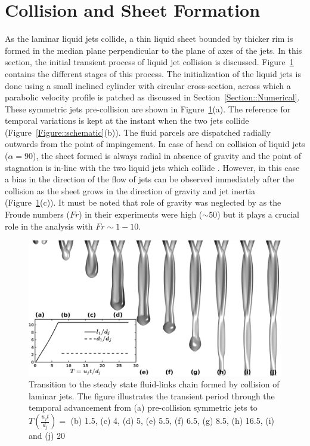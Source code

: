 \documentclass[%
aip,
sd,%
amsmath,amssymb,
preprint,%
author-year,%
]{revtex4-1}
\begin{document}
\section{Collision and Sheet Formation}
As the laminar liquid jets collide, a thin liquid sheet bounded by thicker rim is formed in the median plane perpendicular to the plane of axes of the jets. In this section, the initial transient process of liquid jet collision is discussed. Figure~\ref{Figure::transient} contains the different stages of this process. The initialization of the liquid jets is done using a small inclined cylinder with circular cross-section, across which a parabolic velocity profile is patched as discussed in Section~\ref{Section::Numerical}. These symmetric jets pre-collision are shown in Figure~\ref{Figure::transient}(a). The reference for temporal variations is kept at the instant when the two jets collide (Figure~\ref{Figure::schematic}(b)). The fluid parcels are dispatched radially outwards from the point of impingement. In case of head on collision of liquid jets ($\alpha = 90$), the sheet formed is always radial in absence of gravity \citep{eggers2008physics} and the point of stagnation is in-line with the two liquid jets which collide \citep{inamura2014effect}. However, in this case a bias in the direction of the flow of jets can be observed immediately after the collision as the sheet grows in the direction of gravity and jet inertia (Figure~\ref{Figure::transient}(c)). It must be noted that role of gravity was neglected by \cite{bush2004collision,bremond2006atomization} as the Froude numbers ($Fr$) in their experiments were high ($\sim 50$) but it plays a crucial role in the analysis with $Fr \sim 1-10$. \\ 
\begin{figure}
	\centering
	\includegraphics[width=\linewidth]{fig0}
	\caption{Transition to the steady state fluid-links chain formed by collision of laminar jets. The figure illustrates the transient period through the temporal advancement from (a) pre-collision symmetric jets to $T (\frac{u_jt}{d_j}) = $ (b) 1.5, (c) 4, (d) 5, (e) 5.5, (f) 6.5, (g) 8.5, (h) 16.5, (i) and (j) 20}
	\label{Figure::transient}
\end{figure}
\end{document}

